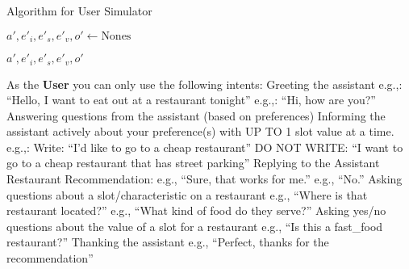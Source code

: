 \documentclass[11pt,a4paper]{article}
\begin{document}
\begin{algorithm}[t]
\LinesNumbered
\DontPrintSemicolon
\caption{Algorithm for User Simulator}
\label{alg:simulator}

\BlankLine

\BlankLine
$a', e'_i, e'_s, e'_v, o' \gets \text{Nones}$ \;

\Return $a', e'_i, e'_s, e'_v, o'$ \;

\end{algorithm}


\iffalse
As the \textbf{User} you can only use the following intents:
Greeting the assistant
    e.g.,: ``Hello, I want to eat out at a restaurant tonight''
    e.g.,: ``Hi, how are you?''
Answering questions from the assistant (based on preferences)
Informing the assistant actively about your preference(s) with UP TO 1 slot value at a time.
    e.g.,: Write: ``I’d like to go to a cheap restaurant''
    DO NOT WRITE: ``I want to go to a cheap restaurant that has street parking''
Replying to the Assistant Restaurant Recommendation:
    e.g., ``Sure, that works for me.''
    e.g., ``No.''
Asking questions about a slot/characteristic on a restaurant
    e.g., ``Where is that restaurant located?''
    e.g., ``What kind of food do they serve?''
Asking yes/no questions about the value of a slot for a restaurant
    e.g., ``Is this a fast_food restaurant?''
Thanking the assistant
    e.g., ``Perfect, thanks for the recommendation''
\end{document}

